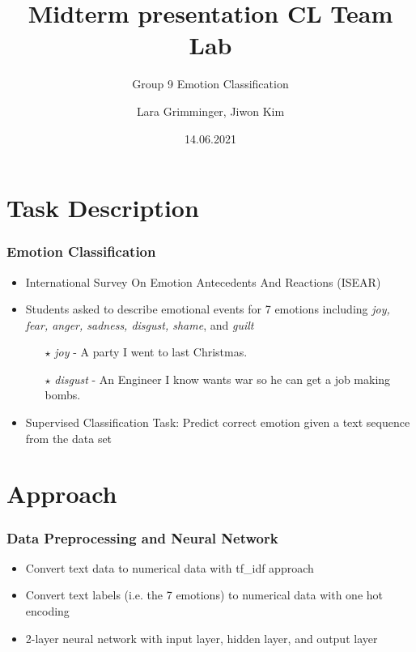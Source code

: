 \documentclass[aspectratio=169]{beamer}
\title[Miterm presentation CL Team Lab]
{Midterm presentation CL Team Lab}
\subtitle{Group 9 Emotion Classification}
\author{Lara Grimminger, Jiwon Kim}
\date{14.06.2021}
\begin{document}
\begin{frame}
\maketitle
\end{frame}

\section{Task Description}


\begin{frame}
\frametitle{Emotion Classification}

\begin{itemize}
\setlength\itemsep{1em}
\item International Survey On Emotion Antecedents And Reactions (ISEAR)
\item Students asked to describe emotional events for 7 emotions including \emph{joy, fear, anger, sadness, disgust, shame}, and \emph{guilt}
\hspace{+5mm}
\begin{itemize}
\setlength\itemsep{0.3em}
\item [$\star$]\emph{joy} - A party I went to last Christmas.
\item [$\star$]\emph{disgust} - An Engineer I know wants war so he can get a job making bombs.

\end{itemize}

\item Supervised Classification Task: Predict correct emotion given a text sequence from the data set

\end{itemize}

\end{frame}


\section{Approach}

\begin{frame}
\frametitle{Data Preprocessing and Neural Network}
\begin{itemize}


\item Convert text data to numerical data with tf\_idf approach
\item Convert text labels (i.e. the 7 emotions) to numerical data with one hot encoding
\item 2-layer neural network with input layer, hidden layer, and output layer
\end{itemize}
\end{frame}
\end{document}
